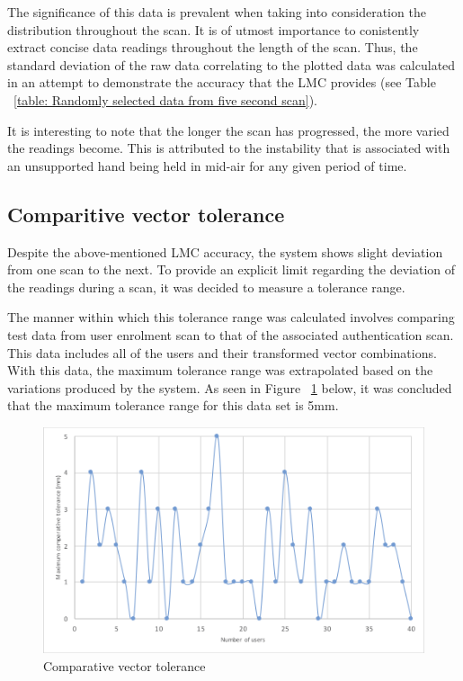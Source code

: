 The significance of this data is prevalent when taking into consideration the distribution throughout the scan. It is of utmost importance to conistently extract concise data readings throughout the length of the scan. Thus, the standard deviation of the raw data correlating to the plotted data was calculated in an attempt to demonstrate the accuracy that the LMC provides (see Table ~\ref{table: Randomly selected data from five second scan}).

It is interesting to note that the longer the scan has progressed, the more varied the readings become. This is attributed to the instability that is associated with an unsupported hand being held in mid-air for any given period of time.

\subsection{Comparitive vector tolerance}

Despite the above-mentioned LMC accuracy, the system shows slight deviation from one scan to the next. To provide an explicit limit regarding the deviation of the readings during a scan, it was decided to measure a tolerance range.

The manner within which this tolerance range was calculated involves comparing test data from user enrolment scan to that of the associated authentication scan. This data includes all of the users and their transformed vector combinations. With this data, the maximum tolerance range was extrapolated based on the variations produced by the system. As seen in Figure ~\ref{fig:Comparative vector tolerance} below, it was concluded that the maximum tolerance range for this data set is 5mm.

    
    \begin{figure}[htbp!] 
    \centering    
    \includegraphics[width=1.0\textwidth]{Chapter4/Figs/Comparative.png}
    \caption[Comparative vector tolerance]{Comparative vector tolerance}
    \label{fig:Comparative vector tolerance}
    \end{figure}

